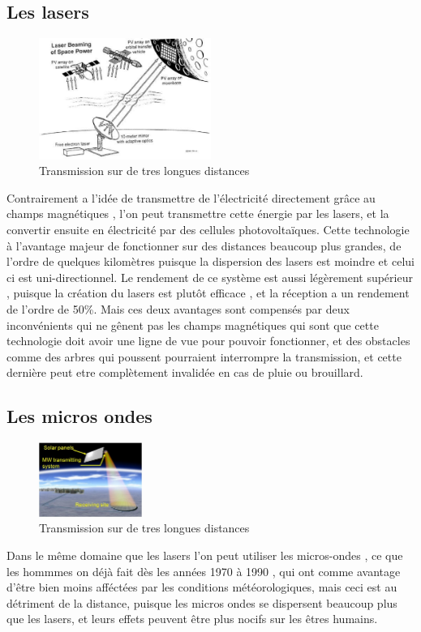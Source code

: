 \documentclass[12pt]{report}
\begin{document}
  \subsection{Les lasers}
\begin{figure}
  \begin{center}
    \includegraphics[width=0.5\textwidth]{laser}
  \end{center}
  \caption{Transmission sur de tres longues distances}
\end{figure}Contrairement a l'idée de transmettre de l'électricité directement grâce au champs magnétiques , l'on peut transmettre cette énergie par les lasers, et la convertir ensuite en électricité par des cellules photovoltaïques. Cette technologie à l'avantage majeur de fonctionner sur des distances beaucoup plus grandes, de l'ordre de quelques kilomètres puisque la dispersion des lasers est moindre et celui ci est uni-directionnel. Le rendement de ce système est aussi légèrement supérieur , puisque la création du lasers est plutôt efficace , et la réception a un rendement de l'ordre de 50\%. Mais ces deux avantages sont compensés par deux inconvénients qui ne gênent pas les champs magnétiques qui sont que cette technologie doit avoir une ligne de vue pour pouvoir fonctionner, et des obstacles comme des arbres qui poussent pourraient interrompre la transmission, et cette dernière peut etre complètement invalidée en cas de pluie ou brouillard.
    \subsection{Les micros ondes}
\begin{figure}
  \begin{center}
    \includegraphics[width=0.3\textwidth]{microwave}
  \end{center}
  \caption{Transmission sur de tres longues distances}
\end{figure}Dans le même domaine que les lasers l'on peut utiliser les micros-ondes , ce que les hommmes on déjà fait dès les années 1970 à 1990 , qui ont comme avantage d'être bien moins afféctées par les conditions météorologiques, mais ceci est au détriment de la distance, puisque les micros ondes se dispersent beaucoup plus que les lasers, et leurs effets peuvent être plus nocifs sur les êtres humains.
\end{document}
